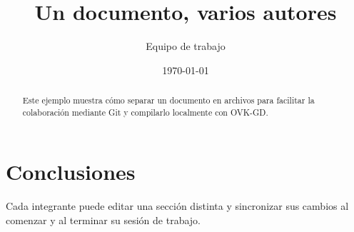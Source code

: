\documentclass[12pt]{article}
\title{Un documento, varios autores}
\author{Equipo de trabajo}
\date{\today}
\begin{document}
\maketitle

\begin{abstract}
Este ejemplo muestra cómo separar un documento en archivos para facilitar
la colaboración mediante Git y compilarlo localmente con OVK-GD.
\end{abstract}




\section{Conclusiones}
Cada integrante puede editar una sección distinta y sincronizar sus cambios
al comenzar y al terminar su sesión de trabajo.
\end{document}

